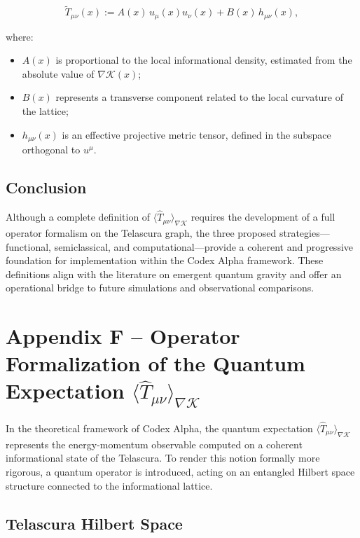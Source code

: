 \documentclass[12pt]{article}
\begin{document}
\begin{equation}
\tilde{T}_{\mu\nu}(x) := A(x) \, u_\mu(x) u_\nu(x) + B(x) \, h_{\mu\nu}(x),
\end{equation}

where:
\begin{itemize}
    \item $A(x)$ is proportional to the local informational density, estimated from the absolute value of $\nabla \mathcal{K}(x)$;
    \item $B(x)$ represents a transverse component related to the local curvature of the lattice;
    \item $h_{\mu\nu}(x)$ is an effective projective metric tensor, defined in the subspace orthogonal to $u^\mu$.
\end{itemize}

\subsection*{Conclusion}

Although a complete definition of $\langle \hat{T}_{\mu\nu} \rangle_{\nabla \mathcal{K}}$ requires the development of a full operator formalism on the Telascura graph, the three proposed strategies—functional, semiclassical, and computational—provide a coherent and progressive foundation for implementation within the Codex Alpha framework. These definitions align with the literature on emergent quantum gravity and offer an operational bridge to future simulations and observational comparisons.

\section*{Appendix F – Operator Formalization of the Quantum Expectation \texorpdfstring{$\langle \hat{T}_{\mu\nu} \rangle_{\nabla \mathcal{K}}$}{⟨T̂μν⟩∇K}}

In the theoretical framework of Codex Alpha, the quantum expectation $\langle \hat{T}_{\mu\nu} \rangle_{\nabla \mathcal{K}}$ represents the energy-momentum observable computed on a coherent informational state of the Telascura. To render this notion formally more rigorous, a quantum operator is introduced, acting on an entangled Hilbert space structure connected to the informational lattice.

\subsection*{Telascura Hilbert Space}
\end{document}
